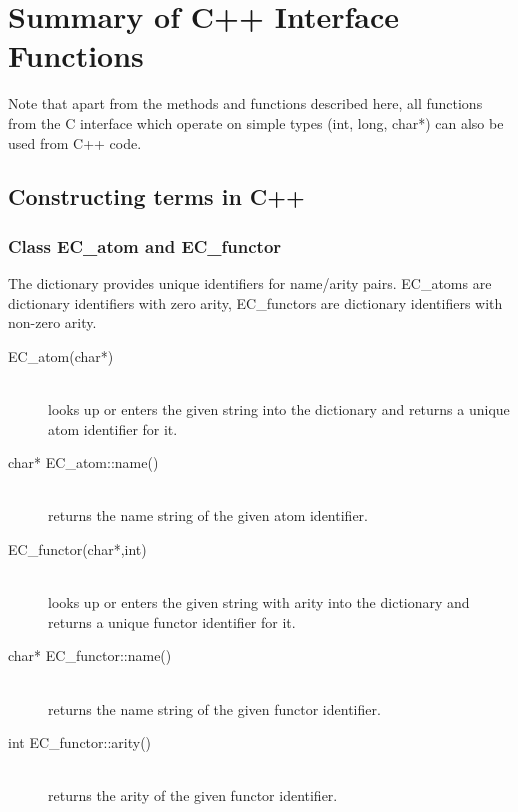 %
% 
% 
% 
% 
%
%

\chapter{Summary of C++ Interface Functions}
\label{chapsumcxx}
Note that apart from the methods and functions described here,
all functions from the C interface which operate on simple types
(int, long, char*) can also be used from C++ code.

\section{Constructing {\eclipse} terms in C++}

\subsection{Class EC_atom and EC_functor}
The {\eclipse} dictionary provides unique identifiers for
name/arity pairs. EC_atoms are dictionary identifiers with zero arity,
EC_functors are dictionary identifiers with non-zero arity.
\begin{description}
\item[EC_atom(char*)]\ \\
	looks up or enters the given string into the {\eclipse}
	dictionary and returns a unique atom identifier for it.

\item[char* EC_atom::name()]\ \\
	returns the name string of the given atom identifier.

\item[EC_functor(char*,int)]\ \\
	looks up or enters the given string with arity into the {\eclipse}
	dictionary and returns a unique functor identifier for it.

\item[char* EC_functor::name()]\ \\
	returns the name string of the given functor identifier.

\item[int EC_functor::arity()]\ \\
	returns the arity of the given functor identifier.
\end{description}


